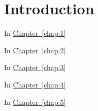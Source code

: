 \chapter{Introduction}



\bigskip
In \hyperref[chap:1]{Chapter~\ref*{chap:1}} 


\bigskip
In \hyperref[chap:2]{Chapter~\ref*{chap:2}} 


\bigskip
In \hyperref[chap:3]{Chapter~\ref*{chap:3}} 


\bigskip
In \hyperref[chap:4]{Chapter~\ref*{chap:4}} 


\bigskip
In \hyperref[chap:5]{Chapter~\ref*{chap:5}} 